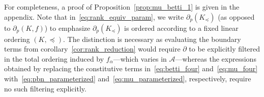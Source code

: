 \documentclass[10pt]{article}
\numberwithin{equation}{section}
\newcommand{\+}{%
	\raisebox{0.18ex}{\scaleobj{0.55}{+}}
}
\theoremstyle{definition}
\newtheorem{remark}{Remark}
\theoremstyle{definition}
\begin{document}
\noindent For completeness, a proof of Proposition~\ref{prop:mu_betti_1} is given in the appendix. 
Note that in~\eqref{eq:rank_equiv_param}, we write $\partial_p(K_{\preceq})$ (as opposed to $\partial_p(K, f)$) to emphasize $\partial_p(K_{\preceq})$ is ordered  according to a fixed linear ordering $(K, \preceq)$. The distinction is necessary as evaluating the boundary terms from corollary~\ref{cor:rank_reduction} would require $\partial$ to be explicitly filtered in the total ordering induced by $f_\alpha$---which varies in $\mathcal{A}$---whereas the expressions obtained by replacing the constitutive terms in~\eqref{eq:betti_four} and~\eqref{eq:mu_four} with~\eqref{eq:pbn_parameterized} and~\eqref{eq:mu_parameterized}, respectively, require no such  filtering explicitly.  



\end{document}

